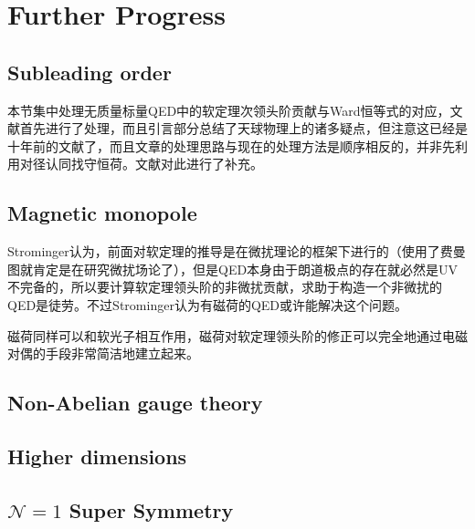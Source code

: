 \section{Further Progress}
\subsection{Subleading order}
本节集中处理无质量标量QED中的软定理次领头阶贡献与Ward恒等式的对应，文献\cite{Lysov:2014csa}首先进行了处理，而且引言部分总结了天球物理上的诸多疑点，但注意这已经是十年前的文献了，而且文章的处理思路与现在的处理方法是顺序相反的，并非先利用对径认同找守恒荷。文献\cite{Campiglia:2016hvg}对此进行了补充。
\subsection{Magnetic monopole}
Strominger认为，前面对软定理的推导是在微扰理论的框架下进行的（使用了费曼图就肯定是在研究微扰场论了），但是QED本身由于朗道极点的存在就必然是UV不完备的，所以要计算软定理领头阶的非微扰贡献，求助于构造一个非微扰的QED是徒劳。不过Strominger认为有磁荷的QED或许能解决这个问题\cite{Strominger:2015bla}。

磁荷同样可以和软光子相互作用，磁荷对软定理领头阶的修正可以完全地通过电磁对偶的手段非常简洁地建立起来。
\subsection{Non-Abelian gauge theory}
\subsection{Higher dimensions}
\subsection{$\mathcal{N}=1$ Super Symmetry}


